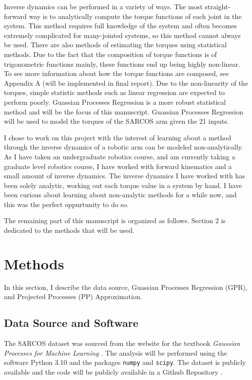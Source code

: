 \documentclass{article}
\begin{document}
    Inverse dynamics can be performed in a variety of ways. The most straight-forward way is to
    analytically compute the torque functions of each joint in the system. This method requires
    full knowledge of the system and often becomes extremely complicated for many-jointed
    systems, so this method cannot always be used. There are also methods of estimating the
    torques using statistical methods. Due to the fact that the composition of torque functions
    is of trigonometric functions mainly, these functions end up being highly non-linear. To see
    more information about how the torque functions are composed, see Appendix A (will be
    implemented in final report). Due to the non-linearity of the torques, simple statistic
    methods such as linear regression are expected to perform poorly. Guassian Processes
    Regression is a more robust statistical method and will be the focus of this manuscript.
    Guassian Processes Regression will be used to model the torques of the SARCOS arm given the 21
    inputs.
    
    I chose to work on this project with the interest of learning about a method through
    the inverse dynamics of a robotic arm can be modeled non-analytically. As I have taken an
    undergraduate robotics course, and am currently taking a graduate level robotics course, I
    have worked with forward kinematics and a small amount of inverse dynamics. The inverse
    dynamics I have worked with has been solely analytic, working out each torque value in a system
    by hand. I have been curious about learning about non-analytic methods for a while now, and
    this was the perfect oppurtunity to do so.
    
    The remaining part of this manuscript is organized as follows. Section 2 is dedicated to the
    methods that will be used.
    
    \section{Methods}
    
    In this section, I describe the data source, Guassian Processes Regression (GPR), and
    Projected Processes (PP) Approximation.
    
    \subsection{Data Source and Software}
    
    The SARCOS dataset was sourced from the website for the textbook 
    \textit{Gaussian Processes for Machine Learning} \citet{sarcos}. The analysis will be performed
    using the software Python 3.10 and the packages \texttt{numpy} and \texttt{scipy}. The dataset
    is publicly available and the code will be publicly available in a Github Repository
    \citep{github}.
    
\end{document}

